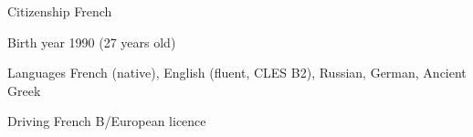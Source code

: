 
\begin{cvskills}

	\cvskill
		{Citizenship}
    {French}

	\cvskill
		{Birth year}
    {1990 (27 years old)}

	\cvskill
		{Languages}
    {French (native), English (fluent, CLES B2), Russian, German, Ancient Greek}

	\cvskill
		{Driving}
    {French B/European licence}

\end{cvskills}
